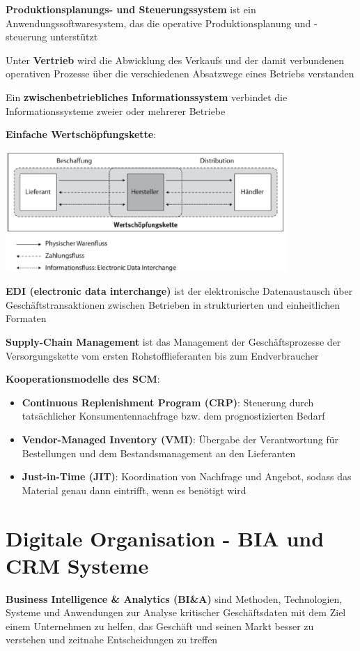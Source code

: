 \textbf{Produktionsplanungs- und Steuerungssystem} ist ein Anwendungssoftwaresystem, das die operative Produktionsplanung und -steuerung unterstützt

Unter \textbf{Vertrieb} wird die Abwicklung des Verkaufs und der damit verbundenen operativen Prozesse über die verschiedenen Absatzwege eines Betriebs verstanden

Ein \textbf{zwischenbetriebliches Informationssystem} verbindet die Informationssysteme zweier oder mehrerer Betriebe

\textbf{Einfache Wertschöpfungskette}: 
\begin{center}
	\includegraphics[width=0.8\textwidth]{images/sc.png}
\end{center}

\textbf{EDI (electronic data interchange)} ist der elektronische Datenaustausch über Geschäftstransaktionen zwischen Betrieben in strukturierten und einheitlichen Formaten

\textbf{Supply-Chain Management} ist das Management der Geschäftsprozesse der Versorgungskette vom ersten Rohstofflieferanten bis zum Endverbraucher

\textbf{Kooperationsmodelle des SCM}:
\begin{itemize}
	\item \textbf{Continuous Replenishment Program (CRP)}: Steuerung durch tatsächlicher Konsumentennachfrage bzw. dem prognostizierten Bedarf
	\item \textbf{Vendor-Managed Inventory (VMI)}: Übergabe der Verantwortung für Bestellungen und dem
	Bestandsmanagement an den Lieferanten
	\item \textbf{Just-in-Time (JIT)}: Koordination von Nachfrage und Angebot, sodass das Material genau dann eintrifft, wenn es benötigt wird
\end{itemize}

\section{Digitale Organisation - BIA und CRM Systeme}
\textbf{Business Intelligence \& Analytics (BI\&A)} sind Methoden, Technologien, Systeme und Anwendungen zur Analyse kritischer Geschäftsdaten mit dem Ziel einem Unternehmen zu helfen, das Geschäft und seinen Markt besser zu verstehen und zeitnahe Entscheidungen zu treffen

